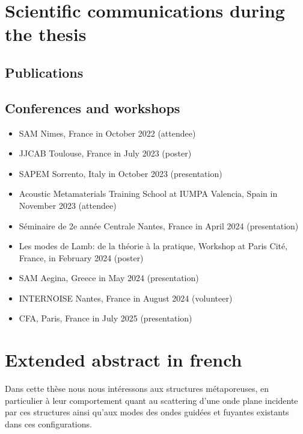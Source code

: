 \section{Scientific communications during the thesis}
\subsection{Publications}
    \begingroup
    \renewcommand*{\bibfont}{\fontsize{12}{12}\selectfont}
    \newrefcontext[labelprefix=P]
    \printbibliography[heading=none,env=mespublis,keyword=mespapiers]
    \endrefcontext
    \endgroup

\subsection{Conferences and workshops} 
\begin{itemize}
    \item SAM Nimes, France in {October 2022 }(attendee)
    \item JJCAB Toulouse, France in {July 2023 } (poster)
    \item SAPEM Sorrento, Italy in {October 2023 } (presentation)
    \item Acoustic Metamaterials Training School at IUMPA Valencia, Spain in {November 2023}  (attendee)
    \item  Séminaire de 2e année Centrale Nantes, France in {April 2024}  (presentation)
    \item Les modes de Lamb: de la théorie à la pratique, Workshop at Paris Cité, France, in {February 2024} (poster)
    \item SAM Aegina, Greece in {May 2024} (presentation)
    \item INTERNOISE Nantes, France in {August 2024} (volunteer)
    \item CFA, Paris, France in {July 2025} (presentation)
\end{itemize}

\section{Extended abstract in french}
Dans cette thèse nous nous intéressons aux structures métaporeuses, en particulier à leur comportement quant au scattering d'une onde plane incidente par ces structures ainsi qu'aux modes des ondes guidées et fuyantes existants dans ces configurations. 

